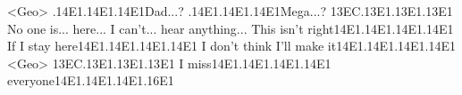 <Geo> .{14}{E1}.{14}{E1}.{14}{E1}Dad...? 
.{14}{E1}.{14}{E1}.{14}{E1}Mega...? 
{13}{EC}.{13}{E1}.{13}{E1}.{13}{E1} 
No one is... here... I can't... hear anything... 
This isn't right{14}{E1}.{14}{E1}.{14}{E1}.{14}{E1} 
If I stay here{14}{E1}.{14}{E1}.{14}{E1}.{14}{E1} I don't think I'll make it{14}{E1}.{14}{E1}.{14}{E1}.{14}{E1} 
<Geo> {13}{EC}.{13}{E1}.{13}{E1}.{13}{E1} 
I miss{14}{E1}.{14}{E1}.{14}{E1}.{14}{E1} everyone{14}{E1}.{14}{E1}.{14}{E1}.{16}{E1} 
